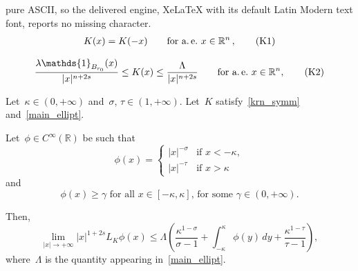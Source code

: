 \documentclass[10pt,a4paper]{amsart}
\newcommand{\R}{\mathbb{R}}
\begin{document}
pure ASCII, so the delivered engine, XeLaTeX with its default Latin Modern text font, reports no missing character.
\begin{align}
K(x)= K(-x) \qquad \text{for a.~\!e.}~x\in \R^n\,, \label{krn_symm}\tag{K1}
\end{align}

\begin{align}
\frac{\lambda\mathds{1}_{B_{r_0}}(x)}{|x|^{n+2s}}\leq K(x) \leq \frac{\Lambda}{|x|^{n+2s}} \qquad \text{for a.~\!e.}~x \in \R^n, \label{main_ellipt}\tag{K2} \end{align}

\begin{prop}\label{tonto}
Let~$\kappa\in (0, +\infty)$ and~$\sigma$, $\tau\in(1,+\infty)$. Let~$K$ satisfy~\eqref{krn_symm} and~\eqref{main_ellipt}. 

Let~$\phi \in C^{\infty}(\R)$ be such that
\begin{equation*}
\phi(x)= \begin{cases}
|x|^{-\sigma} &\mbox{if } x<-\kappa, \\
|x|^{-\tau} &\mbox{if } x>\kappa
\end{cases}
\end{equation*}
and
\begin{equation}\label{addipotesi76}
{\mbox{$\phi(x)\ge\gamma$ for all~$x\in[-\kappa,\kappa]$, for some~$\gamma\in(0,+\infty)$.}}
\end{equation}

Then,
\begin{equation}\label{yuuy_secs}
\lim_{|x | \to  +\infty} |x|^{1+2s} {L}_K\phi(x) \leq \Lambda \left( \frac{\kappa^{1-\sigma}}{\sigma-1}+ \int_{-\kappa}^{\kappa} \phi(y) \, dy+\frac{\kappa^{1-\tau}}{\tau-1}\right),
\end{equation}
where~$\Lambda$ is the quantity appearing in~\eqref{main_ellipt}.
\end{prop}
\end{document}
